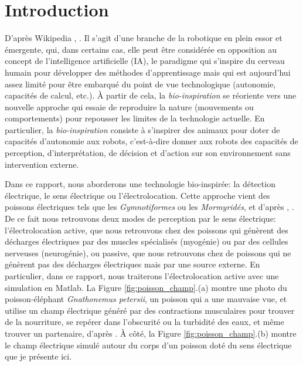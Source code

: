 \section{Introduction}

D'après Wikipedia \cite{Wiki}, . Il s'agit d'une branche de la robotique en plein essor et émergente, qui, dans certains cas, elle peut être considérée en opposition au concept de l'intelligence artificielle (IA), le paradigme qui s'inspire du cerveau humain pour développer des méthodes d'apprentissage mais qui est aujourd'hui assez limité pour être embarqué du point de vue technologique (autonomie, capacités de calcul, etc.). À partir de cela, la \textit{bio-inspiration} se réoriente vers une nouvelle approche qui essaie de reproduire la nature (mouvements ou comportements) pour repousser les limites de la technologie actuelle. En particulier, la \textit{bio-inspiration} consiste à s'inspirer des animaux pour doter de capacités d'autonomie aux robots, c'est-à-dire donner aux robots des capacités de perception, d'interprétation, de décision et d'action sur son environnement sans intervention externe. 

Dans ce rapport, nous aborderons une technologie bio-inspirée: la détection électrique, le sens électrique ou l'électrolocation. Cette approche vient des poissons électriques tels que les \textit{Gymnotiformes} ou les \textit{Mormyridés}, et d'après \cite{Panama}, . De ce fait nous retrouvons deux modes de perception par le sens électrique: l'électrolocation active, que nous retrouvons chez des poissons qui génèrent des décharges électriques par des muscles spécialisés (myogénie) ou par des cellules nerveuses (neurogénie), ou passive, que nous retrouvons chez de poissons qui ne génèrent pas des décharges électriques mais par une source externe. En particulier, dans ce rapport, nous traiterons l'électrolocation active avec une simulation en Matlab. La Figure \ref{fig:poisson_champ}.(a) montre une photo du poisson-éléphant \textit{Gnathonemus petersii}, un poisson qui a une mauvaise vue, et utilise un champ électrique généré par des contractions musculaires pour trouver de la nourriture, se repérer dans l'obscurité ou la turbidité des eaux, et même trouver un partenaire, d'après \cite{Wiki2}. À côté, la Figure \ref{fig:poisson_champ}.(b) montre le champ électrique simulé autour du corps d'un poisson doté du sens électrique que je présente ici. 


